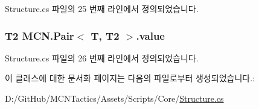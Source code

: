 Structure.\+cs 파일의 25 번째 라인에서 정의되었습니다.

\subsubsection[{\texorpdfstring{value}{value}}]{\setlength{\rightskip}{0pt plus 5cm}T2 {\bf M\+C\+N.\+Pair}$<$ T, T2 $>$.value}\hypertarget{class_m_c_n_1_1_pair_a1980bbf37b60fcbfea22382f71250e84}{}\label{class_m_c_n_1_1_pair_a1980bbf37b60fcbfea22382f71250e84}


Structure.\+cs 파일의 26 번째 라인에서 정의되었습니다.



이 클래스에 대한 문서화 페이지는 다음의 파일로부터 생성되었습니다.\+:\begin{DoxyCompactItemize}
\item 
D\+:/\+Git\+Hub/\+M\+C\+N\+Tactics/\+Assets/\+Scripts/\+Core/\hyperlink{_structure_8cs}{Structure.\+cs}\end{DoxyCompactItemize}

